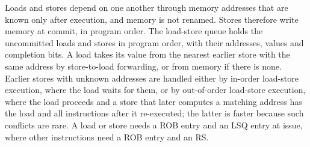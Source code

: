 \documentclass[../main.tex]{subfiles}
\begin{document}
\begin{keypoint}
  Loads and stores depend on one another through memory addresses that are
  known only after execution, and memory is not renamed.  Stores therefore
  write memory at commit, in program order.  The load-store queue holds the
  uncommitted loads and stores in program order, with their addresses, values
  and completion bits.  A load takes its value from the nearest earlier store
  with the same address by store-to-load forwarding, or from memory if there
  is none.  Earlier stores with unknown addresses
  are handled either by in-order load-store execution, where the load waits for
  them, or by out-of-order load-store execution, where the load proceeds and a
  store that later computes a matching address has the load and all
  instructions after it re-executed; the latter is faster because such
  conflicts are rare.  A load or store needs a ROB entry and an LSQ entry at
  issue, where other instructions need a ROB entry and an RS.
\end{keypoint}
\end{document}
